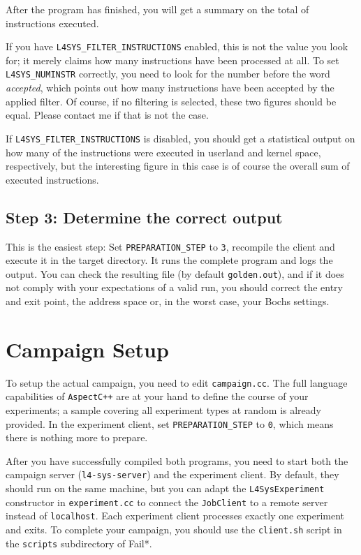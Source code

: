 \documentclass[a4paper,10pt]{article}
\begin{document}
After the program has finished, you will get a summary on the
total of instructions executed.

If you have
\verb+L4SYS_FILTER_INSTRUCTIONS+ enabled, this is not the
value you look for; it merely claims how many
instructions have been processed at all.
To set \verb+L4SYS_NUMINSTR+ correctly, you need to look for the
number before the word \emph{accepted}, which points out how many
instructions have been accepted by the applied filter. Of course,
if no filtering is selected, these two figures should be equal.
Please contact me if that is not the case.

If \verb+L4SYS_FILTER_INSTRUCTIONS+ is disabled, you should
get a statistical output on how many of the instructions
were executed in userland and kernel space, respectively,
but the interesting figure in this case is of course the overall
sum of executed instructions.

\subsection{Step 3: Determine the correct output}

This is the easiest step: Set \verb+PREPARATION_STEP+ to \texttt{3},
recompile the client and execute it in the target directory.
It runs the complete program and logs the output. You can
check the resulting file (by default \texttt{golden.out}),
and if it does not comply with your expectations of a valid
run, you should correct the entry and exit point, the address space
or, in the worst case, your Bochs settings.

\section{Campaign Setup}

To setup the actual campaign, you need to edit \texttt{campaign.cc}.
The full language capabilities of \texttt{AspectC++} are at your hand to define
the course of your experiments; a sample covering all experiment
types at random is already provided. In the experiment client,
set \verb+PREPARATION_STEP+ to \texttt{0}, which means there is nothing more
to prepare.

After you have successfully compiled both programs, you need to
start both the campaign server (\texttt{l4-sys-server})
and the experiment client. By default, they should run on the
same machine, but you can adapt the \texttt{L4SysExperiment}
constructor in \texttt{experiment.cc} to connect the \texttt{JobClient}
to a remote server instead of \texttt{localhost}. Each experiment client processes
exactly one experiment and exits. To complete your campaign,
you should use the \texttt{client.sh} script in the \texttt{scripts}
subdirectory of Fail*.
\end{document}
